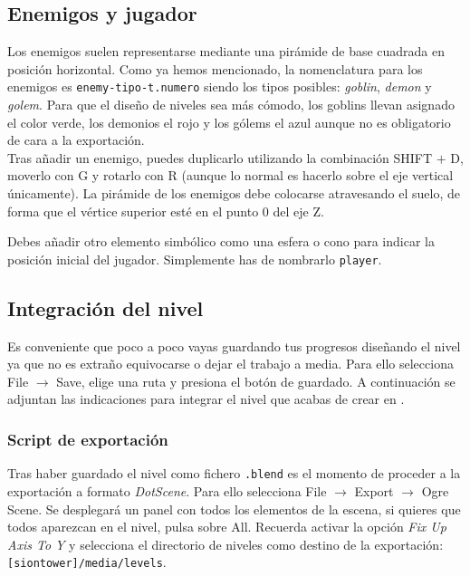 \subsection*{Enemigos y jugador}

Los enemigos suelen representarse mediante una pirámide de base cuadrada
en posición horizontal. Como ya hemos mencionado, la nomenclatura para los
enemigos es \texttt{enemy-tipo-t.numero} siendo los tipos posibles: \textit{goblin},
\textit{demon} y \textit{golem}. Para que el diseño de niveles sea más cómodo, los goblins
llevan asignado el color verde, los demonios el rojo y los gólems el azul
aunque no es obligatorio de cara a la exportación.\\

Tras añadir un enemigo, puedes duplicarlo utilizando la combinación SHIFT
$+$ D, moverlo con G y rotarlo con R (aunque lo normal es hacerlo sobre
el eje vertical únicamente). La pirámide de los enemigos debe colocarse
atravesando el suelo, de forma que el vértice superior esté en el punto 0
del eje Z.


Debes añadir otro elemento simbólico como una esfera o cono para indicar
la posición inicial del jugador. Simplemente has de nombrarlo \texttt{player}.


\subsection*{Integración del nivel}

Es conveniente que poco a poco vayas guardando tus progresos diseñando el
nivel ya que no es extraño equivocarse o dejar el trabajo a media. Para ello
selecciona File $\rightarrow$ Save, elige una ruta y presiona el botón de
guardado. A continuación se adjuntan las indicaciones para integrar el nivel
que acabas de crear en \juego.

\subsubsection*{Script de exportación}

Tras haber guardado el nivel como fichero \texttt{.blend} es el momento
de proceder a la exportación a formato \textit{DotScene}. Para ello selecciona
File $\rightarrow$ Export $\rightarrow$ Ogre Scene. Se desplegará un panel
con todos los elementos de la escena, si quieres que todos aparezcan
en el nivel, pulsa sobre All. Recuerda activar la opción \textit{Fix Up Axis
To Y} y selecciona el directorio de niveles como destino de la exportación:
\texttt{[siontower]/media/levels}.

